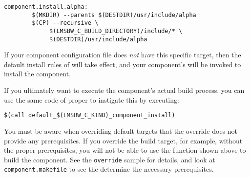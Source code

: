 \begin{verbatim}
component.install.alpha:
        $(MKDIR) --parents $(DESTDIR)/usr/include/alpha
        $(CP) --recursive \
             $(LMSBW_C_BUILD_DIRECTORY)/include/* \
             $(DESTDIR)/usr/include/alpha
\end{verbatim}

If your component configuration file does \emph{not} have this
specific target, then the default install rules of \lmsbw will take
effect, and your component's \makefile will be invoked to install the
component.

If you ultimately want to execute the component's actual build
process, you can use the same code of \lmsbw proper to instigate this
by executing:

\begin{verbatim}
$(call default_$(LMSBW_C_KIND)_component_install)
\end{verbatim}


You must be aware when overriding default targets that the override
does not provide any prerequisites.  If you override the build target,
for example, without the proper prerequisites, you will not be able to
use the function shown above to build the component.  See the
\texttt{override} sample for details, and look at
\texttt{component.makefile} to see the determine the necessary
prerequisites.

